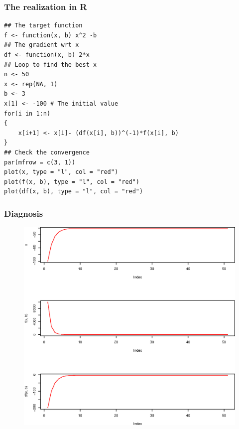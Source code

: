 \documentclass[10pt]{beamer}
\begin{document}
\begin{frame}[fragile]
  \frametitle{The realization in R}
\begin{verbatim}
## The target function
f <- function(x, b) x^2 -b
## The gradient wrt x
df <- function(x, b) 2*x
## Loop to find the best x
n <- 50
x <- rep(NA, 1)
b <- 3
x[1] <- -100 # The initial value
for(i in 1:n)
{
    x[i+1] <- x[i]- (df(x[i], b))^(-1)*f(x[i], b)
}
## Check the convergence
par(mfrow = c(3, 1))
plot(x, type = "l", col = "red")
plot(f(x, b), type = "l", col = "red")
plot(df(x, b), type = "l", col = "red")
\end{verbatim}
\end{frame}

\begin{frame}
\frametitle{Diagnosis}

\begin{figure}
  \centering
  \includegraphics[height=0.92\textheight]{NewtonRaphson}
\end{figure}
\end{frame}
\end{document}
